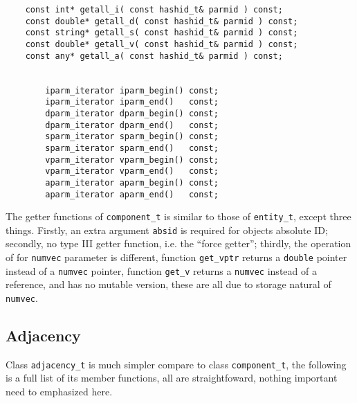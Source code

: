 \documentclass[letterpaper]{book}
\begin{document}
\begin{lstlisting}
	const int* getall_i( const hashid_t& parmid ) const;
	const double* getall_d( const hashid_t& parmid ) const;
	const string* getall_s( const hashid_t& parmid ) const;
	const double* getall_v( const hashid_t& parmid ) const;
	const any* getall_a( const hashid_t& parmid ) const;

        
        iparm_iterator iparm_begin() const; 
        iparm_iterator iparm_end()   const; 
        dparm_iterator dparm_begin() const; 
        dparm_iterator dparm_end()   const; 
        sparm_iterator sparm_begin() const; 
        sparm_iterator sparm_end()   const; 
        vparm_iterator vparm_begin() const; 
        vparm_iterator vparm_end()   const; 
        aparm_iterator aparm_begin() const;  
        aparm_iterator aparm_end()   const;  

\end{lstlisting}

The getter functions of \lstinline$component_t$ is similar to those of \lstinline$entity_t$, 
except three things. 
Firstly, an extra argument \lstinline$absid$ is required for objects absolute ID; 
secondly, no type III getter function, i.e. the ``force getter''; 
thirdly, the operation of for \lstinline$numvec$ parameter is different, 
function \lstinline$get_vptr$ returns a \lstinline$double$ pointer instead of a
\lstinline$numvec$ pointer, function \lstinline$get_v$ returns a \lstinline$numvec$ instead 
of a reference, and has no mutable version, these are all due to storage natural of \lstinline$numvec$.

\subsection{Adjacency}
Class \lstinline$adjacency_t$ is much simpler compare to class \lstinline$component_t$, the
following is a full list of its member functions, all are straightfoward, nothing important
need to emphasized here.
\end{document}
